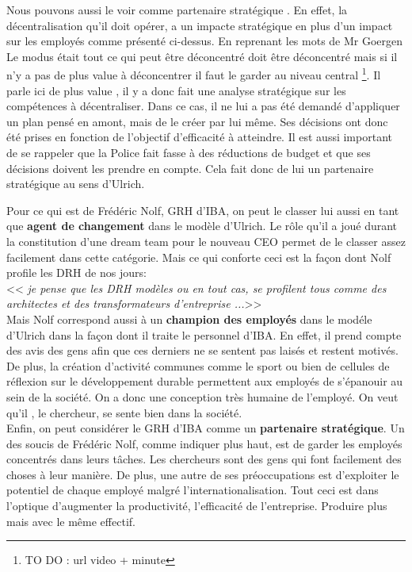 Nous pouvons aussi le voir comme \og partenaire stratégique \fg{}. En effet, la décentralisation qu'il doit opérer, a un impacte stratégique en plus d'un impact sur les employés comme présenté ci-dessus. En reprenant les mots de Mr Goergen \og Le modus était tout ce qui peut être déconcentré doit être déconcentré mais si il n’y a pas de plus value à déconcentrer il faut le garder au niveau central \fg{} \footnote{TO DO : url video + minute}. Il parle ici de \og plus value \fg{}, il y a donc fait une analyse stratégique sur les compétences à décentraliser. Dans ce cas, il ne lui a pas été demandé d'appliquer un plan pensé en amont, mais de le créer par lui même. Ses décisions ont donc été prises en fonction de l'objectif d'efficacité à atteindre. Il est aussi important de se rappeler que la Police fait fasse à des réductions de budget et que ses décisions doivent les prendre en compte. Cela fait donc de lui un \og partenaire stratégique \fg{} au sens d'Ulrich.\\   


Pour ce qui est de Frédéric Nolf, GRH d'IBA, on peut le classer lui aussi en tant que \textbf{agent de changement} dans le modèle d'Ulrich. Le rôle qu'il a joué durant la constitution d'une dream team pour le nouveau CEO permet de le classer assez facilement dans cette catégorie. Mais ce qui conforte ceci est la façon dont Nolf profile les DRH de nos jours:\\

<< \textit{je pense que les DRH modèles ou en tout cas, se profilent tous comme 
des architectes et des transformateurs d’entreprise ...}>> \\

Mais Nolf correspond aussi à un \textbf{champion des employés} dans le modéle d'Ulrich dans la façon dont il traite le personnel d'IBA. En effet, il prend compte des avis des gens afin que ces derniers ne se sentent pas laisés et restent motivés. De plus, la création d'activité communes comme le sport ou bien de cellules de réflexion sur le développement durable permettent aux employés de s'épanouir au sein de la société. On a donc une conception très humaine de l'employé. On veut qu'il , le chercheur, se sente bien dans la société.\\

Enfin, on peut considérer le GRH d'IBA comme un \textbf{partenaire stratégique}. Un des soucis de Frédéric Nolf, comme indiquer plus haut, est de garder les employés concentrés dans leurs tâches. Les chercheurs sont des gens qui font facilement des choses à leur manière. De plus, une autre de ses préoccupations est d'exploiter le potentiel de chaque employé malgré l'internationalisation. Tout ceci est dans l'optique d'augmenter la productivité, l'efficacité de l'entreprise. Produire plus mais avec le même effectif. 



